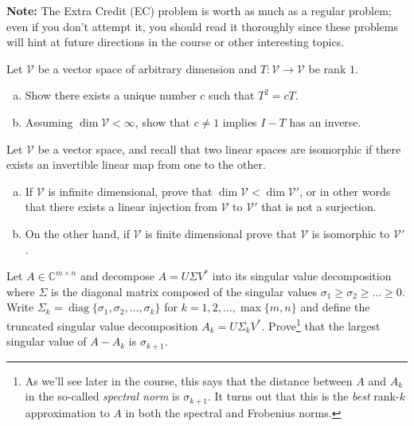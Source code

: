 \documentclass[12pt,letterpaper,cm]{hmcpset}
\begin{document}
\textbf{Note:} The Extra Credit (EC) problem
is worth as much as a regular problem; even if you don't attempt it, you should read it thoroughly
since these problems will hint at future directions in the course or other interesting topics.

\begin{problem}[1 (Lax 3.14)]
    Let $\mathcal{V}$ be a vector space of arbitrary dimension and $T : \mathcal{V}\to\mathcal{V}$
    be rank $1$.
\begin{enumerate}[(a)]
    \item Show there exists a unique number $c$ such that $T^2 = cT$.
    \item Assuming $\dim\mathcal{V}<\infty$, show that $c\neq 1$ implies $I-T$ has an inverse.
\end{enumerate}
\end{problem}

\begin{solution}
    \vfill
\end{solution}

\begin{problem}[2]
    Let $\mathcal{V}$ be a vector space, and recall that two linear spaces are
    isomorphic if there exists an invertible linear map from one to the other.
\begin{enumerate}[(a)]
    \item If $\mathcal{V}$ is infinite dimensional, prove that $\dim\mathcal{V} < \dim\mathcal{V}'$,
        or in other words that there exists a linear injection from $\mathcal{V}$ to $\mathcal{V}'$ that is not a surjection.
    \item On the other hand, if $\mathcal{V}$ is finite dimensional prove that
        $\mathcal{V}$ is isomorphic to $\mathcal{V}'$.
\end{enumerate}
\end{problem}

\begin{solution}
    \vfill
\end{solution}
\clearpage

\begin{problem}[3]
    Let $A\in\mathbb{C}^{m\times n}$ and decompose $A = U \Sigma V^*$ into its singular value
    decomposition where $\Sigma$ is the diagonal matrix composed of the singular values
    $\sigma_1\geq\sigma_2\geq \dots\geq 0$. Write $\Sigma_k = \operatorname{diag}\{\sigma_1,\sigma_2
    ,\ldots,\sigma_k\}$ for $k=1,2,\ldots,\max\{m,n\}$ and define the truncated singular value decomposition
    $A_k = U\Sigma_k V^*$. Prove\footnote{As we'll see later in the course, this says that the distance between
    $A$ and $A_k$ in the so-called \emph{spectral norm} is $\sigma_{k+1}$. It turns out that this is the
    \emph{best} rank-$k$ approximation to $A$ in both the spectral and Frobenius norms.}
    that the largest singular value of $A - A_k$ is $\sigma_{k+1}$.
\end{problem}
\end{document}
